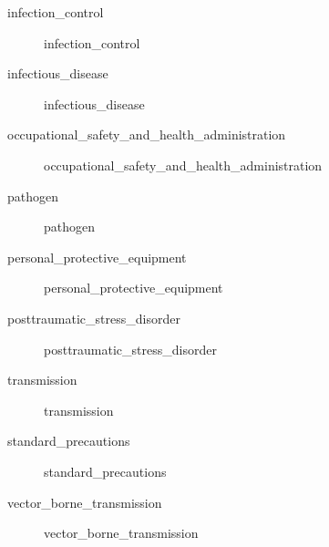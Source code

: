 \documentclass[../../EMT-169.tex]{subfiles}
\begin{document}
\begin{description}
	\item [\gls{infection_control}] 				\glsdesc{infection_control}
	\item [\gls{infectious_disease}] 				\glsdesc{infectious_disease}
	\item [\gls{occupational_safety_and_health_administration}] 	\glsdesc{occupational_safety_and_health_administration}
	\item [\gls{pathogen}] 							\glsdesc{pathogen}
	\item [\gls{personal_protective_equipment}] 	\glsdesc{personal_protective_equipment}
	\item [\gls{posttraumatic_stress_disorder}] 	\glsdesc{posttraumatic_stress_disorder}
	\item [\gls{transmission}] 						\glsdesc{transmission}
	\item [\gls{standard_precautions}] 				\glsdesc{standard_precautions}
	\item [\gls{vector_borne_transmission}] 		\glsdesc{vector_borne_transmission}
\end{description}\hfill \\


\clearpage
\end{document}
